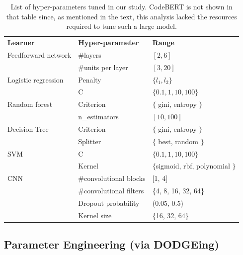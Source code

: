 \begin{table}[!t]
    \centering
    \caption{List of hyper-parameters tuned in our study.
    CodeBERT is not shown
  in that table since, as mentioned in the text, this analysis lacked
  the resources required to tune such a large model.}
    \label{tab:hyperparams}
    
   
    \begin{tabular}{llp{2.2cm}}
        \toprule
        \textbf{Learner} & \textbf{Hyper-parameter} & \textbf{Range}  \\
       
 \rowcolor{gray!15}         Feedforward network & \#layers & $[2, 6]$ \\
  \rowcolor{gray!15}        & \#units per layer & $[3, 20]$ \\
        
       Logistic regression & Penalty & $\{l_1, l_2\}$ \\
        & C & $\{0.1,1,10,100\}$ \\
        
  \rowcolor{gray!15}     Random forest & Criterion & $\{$ gini, entropy $\}$ \\
   \rowcolor{gray!15}       & n\_estimators & $[10, 100]$ \\
        
       Decision Tree & Criterion & $\{$ gini, entropy $\}$ \\
        & Splitter & $\{$ best, random $\}$ \\
         
  \rowcolor{gray!15}     SVM & C & $\{0.1,1,10,100\}$ \\
   \rowcolor{gray!15}       & Kernel & $\{$sigmoid, rbf, polynomial $\}$ \\
   
   CNN & \#convolutional blocks & [1, 4] \\
   & \#convolutional filters & \{4, 8, 16, 32, 64\} \\
   & Dropout probability & (0.05, 0.5) \\
   & Kernel size & \{16, 32, 64\} \\
        \bottomrule
    \end{tabular}
\end{table}
        

\subsection{Parameter Engineering (via DODGEing)}

